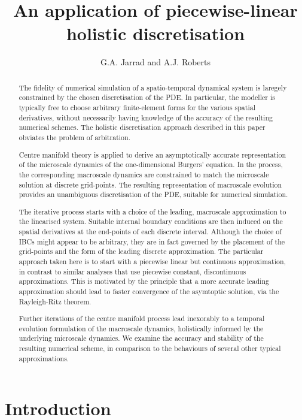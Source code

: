 \documentclass[12pt,a4paper]{article}
\title{An application of piecewise-linear holistic discretisation}
\author{G.A. Jarrad and A.J. Roberts}
\begin{document}
\maketitle

\begin{abstract}
The fidelity of numerical simulation of a spatio-temporal dynamical system is 
laregely constrained by the chosen discretisation of the PDE. 
In particular, the modeller is typically free to choose
arbitrary finite-element forms for the various spatial derivatives,
without necessarily having knowledge of the accuracy of the resulting numerical schemes.
The holistic discretisation approach described in this paper obviates the problem of arbitration. %

Centre manifold theory is applied to derive an asymptotically accurate
representation of the microscale dynamics of the one-dimensional Burgers' equation. 
In the process, the corresponding macroscale dynamics 
are constrained to match the microscale solution at discrete grid-points.
The resulting representation of macroscale evolution provides an unambiguous discretisation of the PDE,
suitable for numerical simulation. 

The iterative process starts with a choice of the leading, macroscale approximation to the linearised system.
Suitable internal boundary conditions are then induced on the spatial derivatives 
at the end-points of each discrete interval.
Although the choice of IBCs might appear to be arbitrary, they are in fact governed by the placement of the grid-points and the 
form of the leading discrete approximation.
The particular approach taken here is to start with a piecewise linear but continuous approximation,
in contrast to similar analyses that use piecewise constant, discontinuous approximations.
This is motivated by the principle that a more accurate leading approximation should lead to faster
convergence of the asymtoptic solution, via the Rayleigh-Ritz theorem.

Further iterations of the centre manifold process lead inexorably to a temporal evolution formulation of the macroscale dynamics,
holistically informed by the underlying microscale dynamics.  
We examine the accuracy and stability of the resulting numerical scheme, in comparison to
the behaviours of several other typical approximations.
\end{abstract}

\section{Introduction}\label{sec:intro}
\end{document}
